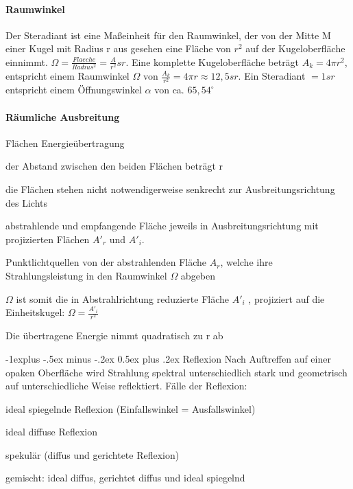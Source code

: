 \documentclass[landscape]{article}
\makeatletter
\renewcommand{\subsection}{\@startsection{subsection}{2}{0mm}%
                                {-1explus -.5ex minus -.2ex}%
                                {0.5ex plus .2ex}%
                                {\normalfont\normalsize\bfseries}}
\makeatother
\begin{document}
\begin{multicols}{3}
  \paragraph{Raumwinkel}
  Der Steradiant ist eine Maßeinheit für den Raumwinkel, der von der Mitte M einer Kugel mit Radius r aus gesehen eine Fläche von $r^2$ auf der Kugeloberfläche einnimmt. $\Omega=\frac{Flaeche}{Radius^2}=\frac{A}{r^2}sr$.
  Eine komplette Kugeloberfläche beträgt $A_k = 4\pi r^2$, entspricht einem Raumwinkel $\Omega$ von $\frac{A_k}{r^2}= 4\pi r\approx 12,5sr$. Ein Steradiant $=1sr$ entspricht einem Öffnungswinkel $\alpha$ von ca. $65,54^{\circ}$
  
  \paragraph{Räumliche Ausbreitung}
  Flächen Energieübertragung
  \begin{itemize*}
    \item der Abstand zwischen den beiden Flächen beträgt r
    \item die Flächen stehen nicht notwendigerweise senkrecht zur Ausbreitungsrichtung des Lichts
    \item abstrahlende und empfangende Fläche jeweils in Ausbreitungsrichtung mit projizierten Flächen $A'_r$ und $A'_i$.
    \item Punktlichtquellen von der abstrahlenden Fläche $A_r$, welche ihre Strahlungsleistung in den Raumwinkel $\Omega$ abgeben
    \item $\Omega$ ist somit die in Abstrahlrichtung reduzierte Fläche $A'_i$ , projiziert auf die Einheitskugel: $\Omega=\frac{A'_i}{r^2}$
    \item Die übertragene Energie nimmt quadratisch zu r ab
  \end{itemize*}
  
  \subsection{Reflexion}
  Nach Auftreffen auf einer opaken Oberfläche wird Strahlung spektral unterschiedlich stark und geometrisch auf unterschiedliche Weise reflektiert. 
  Fälle der Reflexion:
  \begin{itemize*}
    \item ideal spiegelnde Reflexion (Einfallswinkel = Ausfallswinkel)
    \item ideal diffuse Reflexion
    \item spekulär (diffus und gerichtete Reflexion)
    \item gemischt: ideal diffus, gerichtet diffus und ideal spiegelnd
  \end{itemize*}
  

\end{multicols}
\end{document}
